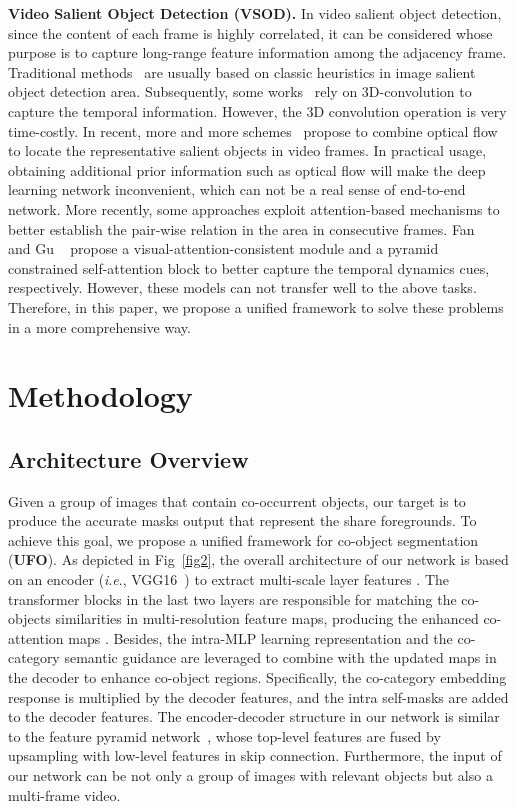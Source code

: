 \documentclass[journal]{IEEEtran}
\newcommand{\ie}{\textit{i}.\textit{e}., }
\begin{document}
\vspace{1ex}

\textbf{Video Salient Object Detection (VSOD).} In video salient object detection, since the content of each frame is highly correlated, it can be considered whose purpose is to capture long-range feature information among the adjacency frame. Traditional methods~\cite{wei2012geodesic,wang2017saliency,xu2019video1,zhou2018improving} are usually based on classic heuristics in image salient object detection area.
Subsequently, some works~\cite{tran2015learning,mahadevan2020making} rely on 3D-convolution to capture the temporal information. However, the 3D convolution operation is very time-costly.
In recent, more and more schemes~\cite{ji2021full,yan2019semi,xu2019video1} propose to combine optical flow~\cite{ilg2017flownet} to locate the representative salient objects in video frames. In practical usage, obtaining additional prior information such as optical flow will make the deep learning network inconvenient, which can not be a real sense of end-to-end network.
More recently, some approaches exploit attention-based mechanisms to better establish the pair-wise relation in the area in consecutive frames. Fan ~\cite{fan2019shifting} and Gu ~\cite{gu2020pyramid} propose a visual-attention-consistent module and a pyramid constrained self-attention block to better capture the temporal dynamics cues, respectively. However, these models can not transfer well to the above  tasks.
Therefore, in this paper, we propose a unified framework to solve these problems in a more comprehensive way.




\section{Methodology}

\subsection{Architecture Overview}
Given a group of  images  that contain co-occurrent objects, our target is to produce the accurate masks output  that represent the share foregrounds. To achieve this goal, we propose a unified framework for co-object segmentation (\textbf{UFO}). As depicted in Fig~\ref{fig2}, the overall architecture of our network is based on an encoder (\ie VGG16~\cite{simonyan2014very}) to extract multi-scale layer features . The transformer blocks in the last two layers are responsible for matching the co-objects similarities in multi-resolution feature maps, producing the enhanced co-attention maps . Besides, the intra-MLP learning representation and the co-category semantic guidance are leveraged to combine with the updated maps in the decoder to enhance co-object regions. Specifically, the co-category embedding response  is multiplied by the decoder features, and the intra self-masks  are added to the decoder features.
The encoder-decoder structure in our network is similar to the feature pyramid network~\cite{lin2017feature}, whose top-level features are fused by upsampling with low-level features in skip connection. 
Furthermore, the input of our network can be not only a group of images with relevant objects but also a multi-frame video.
\end{document}
